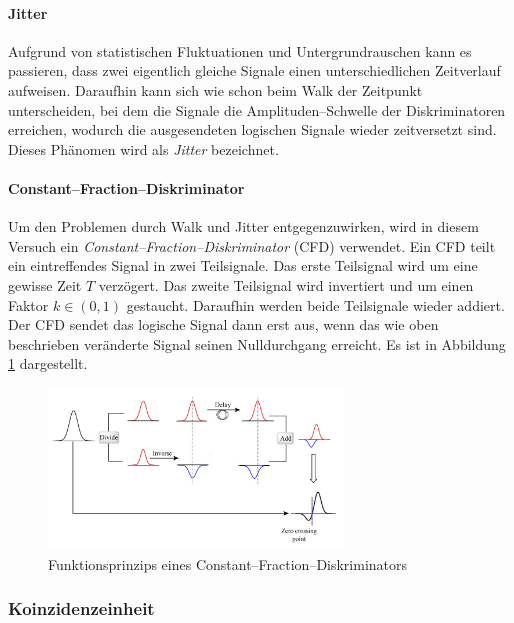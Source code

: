 \documentclass[12pt,a4paper]{scrartcl}
\numberwithin{equation}{section} %
\begin{document}
\hypertarget{jitter}{%
\paragraph{Jitter}\label{jitter}}

Aufgrund von statistischen Fluktuationen und Untergrundrauschen \allowbreak kann es passieren, dass zwei eigentlich gleiche Signale einen unterschiedlichen Zeitverlauf aufweisen. Daraufhin kann sich wie schon beim Walk der Zeitpunkt unterscheiden, bei dem die Signale die Amplituden--Schwelle der Diskriminatoren erreichen, wodurch die ausgesendeten logischen Signale wieder zeitversetzt sind. Dieses Phänomen wird als \emph{Jitter} bezeichnet.

\hypertarget{cfd}{%
\paragraph{Constant--Fraction--Diskriminator}\label{cfd}}

Um den Problemen durch Walk und Jitter entgegenzuwirken, wird in diesem Versuch ein \emph{Constant--Fraction--Diskriminator} (CFD) verwendet. Ein CFD teilt ein eintreffendes Signal in zwei Teilsignale. Das erste Teilsignal wird um eine gewisse Zeit $T$ verzögert. Das zweite Teilsignal wird invertiert und um einen Faktor $k\in(0, 1)$ gestaucht. Daraufhin werden beide Teilsignale wieder addiert. Der CFD sendet das logische Signal dann erst aus, wenn das wie oben beschrieben veränderte Signal seinen Nulldurchgang erreicht. Es ist in Abbildung \ref{abb:CFD} dargestellt.

\begin{figure}[h]
	\centering
	\includegraphics[width=0.7\textwidth]{../media/B3.4/CFD.jpg}
	\caption{Funktionsprinzips eines Constant--Fraction--Diskriminators \cite{abb:CDF}}
	\label{abb:CFD}
\end{figure}

\hypertarget{koinzidenzeinheit}{%
\subsubsection{Koinzidenzeinheit}\label{koinzidenzeinheit}}
\end{document}
